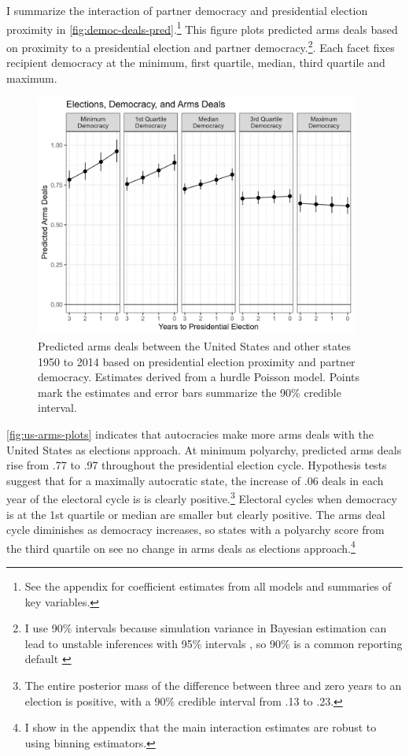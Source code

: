 \documentclass[12pt]{article}
\begin{document}
I summarize the interaction of partner democracy and presidential election proximity in \autoref{fig:democ-deals-pred}.\footnote{See the appendix for coefficient estimates from all models and summaries of key variables.}
This figure plots predicted arms deals based on proximity to a presidential election and partner democracy.\footnote{I use 90\% intervals because simulation variance in Bayesian estimation can lead to unstable inferences with 95\% intervals \citep{McElreath2016}, so 90\% is a common reporting default \citep{Goodrichetal2023}}.
Each facet fixes recipient democracy at the minimum, first quartile, median, third quartile and maximum.


\begin{figure}[htpb]
	\centering
		\includegraphics[width=0.95\textwidth]{../figures/democ-deals-pred.png}
	\caption{Predicted arms deals between the United States and other states 1950 to 2014 based on presidential election proximity and partner democracy. Estimates derived from a hurdle Poisson model. Points mark the estimates and error bars summarize the 90\% credible interval.}
	\label{fig:democ-deals-pred}
\end{figure}


\autoref{fig:us-arms-plots} indicates that autocracies make more arms deals with the United States as elections approach.
At minimum polyarchy, predicted arms deals rise from .77 to .97 throughout the presidential election cycle.
Hypothesis tests suggest that for a maximally autocratic state, the increase of .06 deals in each year of the electoral cycle is is clearly positive.\footnote{The entire posterior mass of the difference between three and zero years to an election is positive, with a 90\% credible interval from .13 to .23.}
Electoral cycles when democracy is at the 1st quartile or median are smaller but clearly positive.
The arms deal cycle diminishes as democracy increases, so states with a polyarchy score from the third quartile on see no change in arms deals as elections approach.\footnote{I show in the appendix that the main interaction estimates are robust to using binning estimators.}  
\end{document}
